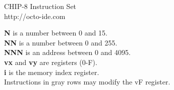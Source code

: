 \documentclass{article}
\begin{document}
	\thispagestyle{empty}
	\begin{center}
		{\LARGE CHIP-8 Instruction Set}
		{\\ \ttfamily http://octo-ide.com}
		\vspace*{0.5cm}

		\textbf{N} is a number between 0 and 15.\\
		\textbf{NN} is a number between 0 and 255.\\
		\textbf{NNN} is an address between 0 and 4095.\\
		\textbf{vx} and \textbf{vy} are registers (0-F).\\
		\textbf{i} is the memory index register.\\
		Instructions in gray rows may modify the vF register.\\

		\vspace*{0.5cm}


\end{center}
\end{document}
